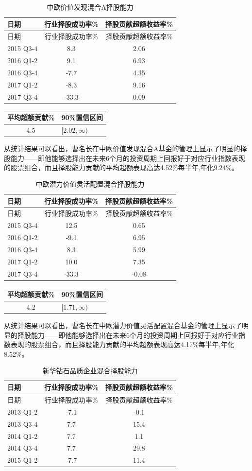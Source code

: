 \documentclass[hyperref,]{ctexart}
\begin{document}
\begin{longtable}[]{@{}lcc@{}}
\caption{中欧价值发现混合A择股能力}\tabularnewline
\toprule
日期 & 行业择股成功率\% & 择股贡献超额收益率\%\tabularnewline
\midrule
\endfirsthead
\toprule
日期 & 行业择股成功率\% & 择股贡献超额收益率\%\tabularnewline
\midrule
\endhead
2015 Q3-4 & 8.3 & 2.06\tabularnewline
2016 Q1-2 & 9.1 & 6.93\tabularnewline
2016 Q3-4 & -7.7 & 4.35\tabularnewline
2017 Q1-2 & -8.3 & 9.16\tabularnewline
2017 Q3-4 & -33.3 & 0.09\tabularnewline
\bottomrule
\end{longtable}

\begin{longtable}[]{@{}cl@{}}
\toprule
平均超额贡献\% & 90\%置信区间\tabularnewline
\midrule
\endhead
4.5 & \([2.02,\infty)\)\tabularnewline
\bottomrule
\end{longtable}

从统计结果可以看出，曹名长在中欧价值发现混合A基金的管理上显示了明显的择股能力------即他能够选择出在未来6个月的投资周期上回报好于对应行业指数表现的股票组合，而且择股能力贡献的平均超额表现高达4.52\%每半年,年化9.24\%。

\begin{longtable}[]{@{}lcc@{}}
\caption{中欧潜力价值灵活配置混合择股能力}\tabularnewline
\toprule
日期 & 行业择股成功率\% & 择股贡献超额收益率\%\tabularnewline
\midrule
\endfirsthead
\toprule
日期 & 行业择股成功率\% & 择股贡献超额收益率\%\tabularnewline
\midrule
\endhead
2015 Q3-4 & 12.5 & 0.65\tabularnewline
2016 Q1-2 & -9.1 & 6.95\tabularnewline
2016 Q3-4 & 8.3 & 5.99\tabularnewline
2017 Q1-2 & 10.0 & 7.35\tabularnewline
2017 Q3-4 & -33.3 & -0.08\tabularnewline
\bottomrule
\end{longtable}

\begin{longtable}[]{@{}cl@{}}
\toprule
平均超额贡献\% & 90\%置信区间\tabularnewline
\midrule
\endhead
4.2 & \([1.71,\infty)\)\tabularnewline
\bottomrule
\end{longtable}

从统计结果可以看出，曹名长在中欧潜力价值灵活配置混合基金的管理上显示了明显的择股能力------即他能够选择出在未来6个月的投资周期上回报好于对应行业指数表现的股票组合，而且择股能力贡献的平均超额表现高达4.17\%每半年,年化8.52\%。

\begin{longtable}[]{@{}lcc@{}}
\caption{新华钻石品质企业混合择股能力}\tabularnewline
\toprule
日期 & 行业择股成功率\% & 择股贡献超额收益率\%\tabularnewline
\midrule
\endfirsthead
\toprule
日期 & 行业择股成功率\% & 择股贡献超额收益率\%\tabularnewline
\midrule
\endhead
2013 Q1-2 & -7.1 & -0.1\tabularnewline
2013 Q3-4 & 7.7 & 15.4\tabularnewline
2014 Q1-2 & 7.7 & 1.1\tabularnewline
2014 Q3-4 & 7.7 & 29.8\tabularnewline
2015 Q1-2 & -7.7 & 11.4\tabularnewline
\bottomrule
\end{longtable}
\end{document}
